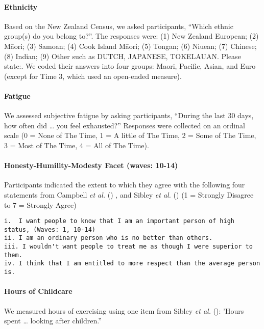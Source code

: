 \documentclass[
  single column]{article}
\let\oldparagraph\paragraph
\renewcommand{\paragraph}[1]{\oldparagraph{#1}\mbox{}}
\begin{document}
\paragraph{Ethnicity}\label{ethnicity}

Based on the New Zealand Census, we asked participants, ``Which ethnic
group(s) do you belong to?''. The responses were: (1) New Zealand
European; (2) Māori; (3) Samoan; (4) Cook Island Māori; (5) Tongan; (6)
Niuean; (7) Chinese; (8) Indian; (9) Other such as DUTCH, JAPANESE,
TOKELAUAN. Please state:. We coded their answers into four groups:
Maori, Pacific, Asian, and Euro (except for Time 3, which used an
open-ended measure).

\paragraph{Fatigue}\label{fatigue}

We assessed subjective fatigue by asking participants, ``During the last
30 days, how often did \ldots{} you feel exhausted?'' Responses were
collected on an ordinal scale (0 = None of The Time, 1 = A little of The
Time, 2 = Some of The Time, 3 = Most of The Time, 4 = All of The Time).

\paragraph{Honesty-Humility-Modesty Facet (waves:
10-14)}\label{honesty-humility-modesty-facet-waves-10-14}

Participants indicated the extent to which they agree with the following
four statements from Campbell \emph{et al.}
() , and Sibley \emph{et al.}
() (1 = Strongly Disagree to 7 = Strongly
Agree)

\begin{verbatim}
i.  I want people to know that I am an important person of high status, (Waves: 1, 10-14)
ii. I am an ordinary person who is no better than others.
iii. I wouldn't want people to treat me as though I were superior to them.
iv. I think that I am entitled to more respect than the average person is.
\end{verbatim}

\paragraph{Hours of Childcare}\label{hours-of-childcare}

We measured hours of exercising using one item from Sibley \emph{et al.}
(): 'Hours spent \ldots{} looking after
children.''
\end{document}
